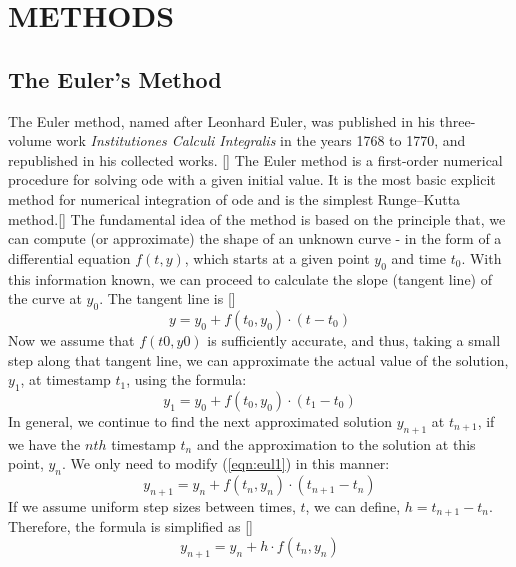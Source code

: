 \documentclass[12pt,oneside]{book}
\begin{document}
	
	\chapter{METHODS}
	\section{The Euler's Method} \label{m:eul}
		\begin{spacing}{1.2}
			
			The Euler method, named after Leonhard Euler, was published in his three-volume work \textit{Institutiones Calculi Integralis} in the years 1768 to 1770, and republished in his collected works.\citep{euler1913institutiones} [] The Euler method is a first-order numerical procedure for solving \ac{ode} with a given initial value. It is the most basic explicit method for numerical integration of \ac{ode} and is the simplest Runge–Kutta method.[] \newline
			The fundamental idea of the method is based on the principle that, we can compute (or approximate) the shape of an unknown curve - in the form of a differential equation $ f(t,y) $, which starts at a given point $ y_{0} $ and time $ t_{0} $. With this information known, we can proceed to calculate the slope (tangent line) of the curve at $ y_{0} $. \newline
			The tangent line is []
			\begin{equation*}
				y = y_{0} + f(t_{0}, y_{0}) \cdot (t - t_{0})
			\end{equation*}
			Now we assume that $ f(t0, y0) $ is sufficiently accurate, and thus, taking a small step along that tangent line, we can approximate the actual value of the solution, $ y_{1} $, at timestamp $ t_{1} $, using the formula:
			\begin{equation} \label{eqn:eul1}
				y_{1} = y_{0} + f(t_{0}, y_{0}) \cdot (t_{1} - t_{0})
			\end{equation}
			In general, we continue to find the next approximated solution $ y_{n+1} $ at $ t_{n+1} $, if we have the $ nth $ timestamp $ t_{n} $ and the approximation to the solution at this point, $ y_{n} $. We only need to modify (\ref{eqn:eul1}) in this manner:
			\begin{equation} \tag{2.2a}
				y_{n+1} = y_{n} + f(t_{n}, y_{n}) \cdot (t_{n+1} - t_{n})
			\end{equation}
			If we assume uniform step sizes between times, $ t $, we can define, $ h = t_{n+1} - t_{n} $. Therefore, the formula is simplified as []
			\begin{equation} \label{eqn:eul} \tag{2.2b}
				y_{n+1} = y_{n} + h \cdot f(t_{n}, y_{n})
			\end{equation}
			

\end{spacing}
\end{document}
